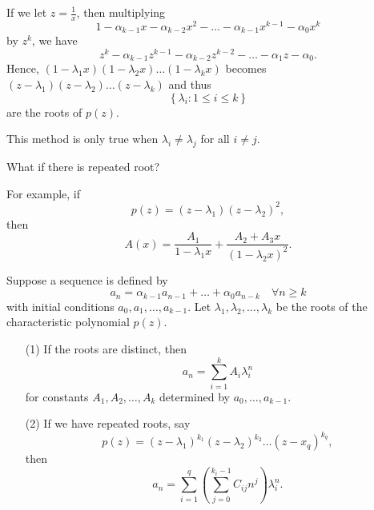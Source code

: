 If we let \(z = \frac{1}{x}\), then multiplying
    \[
        1 - \alpha _{k - 1} x - \alpha _{k - 2} x^2 - \dots - \alpha _{k - 1}x^{k - 1} - \alpha _0 x^k
    \] by \(z^k\), we have 
    \[
        z^k - \alpha _{k - 1} z^{k - 1} - \alpha _{k - 2} z^{k - 2} - \dots - \alpha _1 z - \alpha _0.
    \] Hence, \((1 - \lambda _1 x)(1 - \lambda _2 x) \dots (1 - \lambda _k x)\) becomes \((z - \lambda _1 )(z - \lambda _2) \dots (z - \lambda _k)\) and thus 
    \[
        \left\{ \lambda _i: 1\le i \le k \right\} 
    \] are the roots of \(p(z)\). 

\begin{note}
    This method is only true when \(\lambda _i \neq \lambda _j\) for all \(i \neq j\).  
\end{note}

\begin{question}
    What if there is repeated root?
\end{question}
For example, if 
\[
    p(z) = (z - \lambda _1)(z - \lambda _2)^2,        
\] then 
\[
    A(x) = \frac{A_1}{1 - \lambda _1 x} + \frac{A_2 + A_3 x}{(1 - \lambda _2 x)^2}.
\]
\begin{theorem}
Suppose a sequence is defined by 
\[
    a_n = \alpha _{k - 1} a_{n - 1} + \dots + \alpha _0 a_{n - k} \quad \forall n \ge k        
\] with initial conditions \(a_0, a_1, \dots , a_{k - 1}\). Let \(\lambda _1, \lambda _2, \dots ,\lambda _k\) be the roots of the characteristic polynomial \(p(z)\).
\begin{itemize}
    \item [(1)] If the roots are distinct, then 
    \[
        a_n = \sum_{i=1}^{k} A_i \lambda _i^n 
    \] for constants \(A_1, A_2, \dots , A_k\) determined by \(a_0, \dots , a_{k - 1}\). 
    \item [(2)] If we have repeated roots, say 
    \[
        p(z) = (z - \lambda _1)^{k_1} (z - \lambda _2)^{k_2} \dots (z - x_q)^{k_q},
    \]then 
    \[
        a_n = \sum_{i=1}^{q} \left( \sum_{j=0}^{k_i - 1} C_{ij} n^j  \right) \lambda _i^n.  
    \]
\end{itemize}   
\end{theorem}